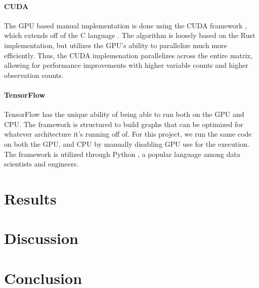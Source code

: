 \documentclass[12pt]{article}
\newcommand{\CC}{C\nolinebreak\hspace{-.05em}\raisebox{.4ex}{\tiny\bf +}\nolinebreak\hspace{-.10em}\raisebox{.4ex}{\tiny\bf +} }
\begin{document}
\paragraph{CUDA}
The GPU based manual implementation is done using the CUDA framework \cite{lib_cuda}, which extends off of the \CC language \cite{lang_c++}.
The algorithm is loosely based on the Rust implementation, but utilizes the GPU's ability to parallelize much more efficiently.
Thus, the CUDA implemenation parallelizes across the entire matrix, allowing for performance improvements with higher variable counts and higher observation counts.

\paragraph{TensorFlow}
TensorFlow \cite{lib_tensorflow} has the unique ability of being able to run both on the GPU and CPU.
The framework is structured to build graphs that can be optimized for whatever architecture it's running off of.
For this project, we run the same code on both the GPU, and CPU by manually disabling GPU use for the execution.
The framework is utilized through Python \cite{lang_python}, a popular language among data scientists and engineers.

\section{Results}

\section{Discussion}


\section{Conclusion}

\newpage


\end{document}
